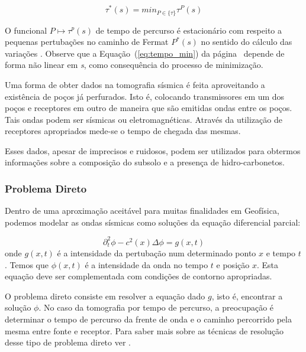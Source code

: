\documentclass[a4paper, 12 pt]{article} %
\begin{document}
\begin{equation}\label{eq:tempo_min}
\tau^*(s) = min_{P \in \{\tau\}} \tau^P (s)
\end{equation}


O funcional $P \mapsto \tau^p(s)$ de tempo de percurso é estacionário com respeito a pequenas pertubações no caminho de Fermat $P^*(s)$ no sentido do cálculo das variações \citep{Axelsson}. Observe que a Equação~(\ref{eq:tempo_min}) da página~\pageref{eq:tempo_min} depende de forma não linear em \textit{s}, como consequência do processo de minimização.

Uma forma de obter dados na tomografia sísmica é feita aproveitando a existência de poços já perfurados. Isto é, colocando transmissores em um dos poços e receptores em outro de maneira que são emitidas ondas entre os poços.
Tais ondas podem ser sísmicas ou eletromagnéticas. Através da utilização de receptores apropriados mede-se o tempo de chegada das mesmas.

Esses dados, apesar de imprecisos e ruidosos, podem ser utilizados para obtermos informações sobre a composição do subsolo e a presença de hidro-carbonetos.


\subsubsection{Problema Direto}

Dentro de uma aproximação aceitável para muitas finalidades em Geofísica, podemos modelar as ondas sísmicas como soluções da equação diferencial parcial:

\begin{equation}\label{eq:problema_direto}
\partial_{t}^2 \phi - c^2(x)  \Delta \phi = g(x, t)
\end{equation}
onde $g(x, t)$ é a intensidade da pertubação num determinado ponto $x$ e tempo $t$. Temos que $\phi (x, t)$ é a intensidade da onda no tempo $t$ e posição $x$. Esta equação deve ser complementada com condições de contorno apropriadas.

O problema direto consiste em resolver a equação dado $g$, isto é, encontrar a solução $\phi$. No caso da tomografia por tempo de percurso, a preocupação é determinar o tempo de percurso da frente de onda e o caminho percorrido pela mesma entre fonte e receptor. Para saber mais sobre as técnicas de resolução desse tipo de problema direto ver \citep{rawlison}.
\end{document}
